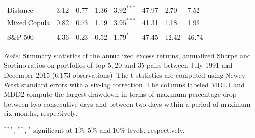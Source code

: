 \documentclass[pdf,9pt,xcolor=dvipsnames,hide notes]{beamer}
\begin{document}
\begin{frame}
\begin{threeparttable}[H]
\begin{tabularx}{\textwidth}{@{\extracolsep{\fill}}llllllll@{}}
				Distance & \cellcolor{celadon} 3.12  & \cellcolor{celadon} 0.77  & 1.36  & $3.92^{***}$  & 47.97 & 2.70  & 7.52 \\
				Mixed Copula & 0.82  & 0.73  & 1.19  & $3.95^{***}$  & 41.31 & \cellcolor{corn} 1.18  & \cellcolor{corn} 1.98  \\
				\multicolumn{1}{r}{} & \multicolumn{1}{r}{} & \multicolumn{1}{r}{} & \multicolumn{1}{r}{} & \multicolumn{1}{r}{} & \multicolumn{1}{r}{} & \multicolumn{1}{r}{} & \multicolumn{1}{r}{} \\
				\midrule
				S\&P 500  & 4.36  & \cellcolor{Melon} 0.23  & 0.52  & $1.79^{*}$  & 47.45 & \cellcolor{Melon} 12.42  & \cellcolor{Melon} 46.74  \\
				\bottomrule
			\end{tabularx}%
			\begin{tablenotes}
				\item \textit{Note:} \scriptsize \tiny Summary statistics of the annualized excess returns, annualized Sharpe and Sortino ratios on portfolios of top 5, 20 and 35 pairs between July 1991 and December 2015 (6,173 observations). The t-statistics are computed using Newey-West standard errors with a six-lag correction. The columns labeled MDD1 and MDD2 compute the largest drawdown in terms of maximum percentage drop between two consecutive days and between two days within a period of maximum six months, respectively.
				\item \scriptsize $^{\ast\ast\ast}$, $^{\ast\ast}$, $^{\ast}$  significant at 1\%, 5\% and 10\% levels, respectively.
			\end{tablenotes}
			\label{tab:table101}%
		\end{threeparttable}%

	\end{frame}
\end{document}
